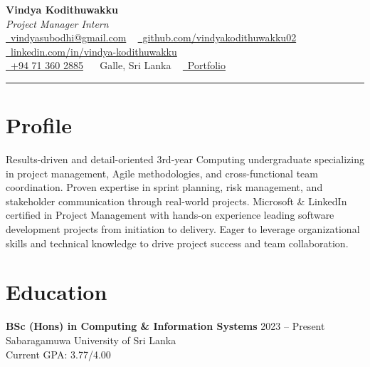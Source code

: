 \documentclass[letterpaper,10.8pt]{article}
\begin{document}
\fontsize{10.5}{12}\selectfont

\begin{center}
{\Huge\color{accentTitle}\textbf{Vindya Kodithuwakku}}\\[3pt]
{\large\textit{Project Manager Intern}}\\[4pt]
\href{mailto:vindyasubodhi@gmail.com}{\faEnvelope~vindyasubodhi@gmail.com} ~
\href{https://github.com/vindyakodithuwakku02}{\faGithub~github.com/vindyakodithuwakku02} ~
\href{https://www.linkedin.com/in/vindya-kodithuwakku-bb6187202}{\faLinkedin~linkedin.com/in/vindya-kodithuwakku}\\[2pt]
\href{tel:+94713602885}{\faPhone~+94 71 360 2885} ~
\faMapMarker*~Galle, Sri Lanka ~
\href{https://vindyakodithuwakku02.github.io/my_portfolio/}{\faGlobe~Portfolio}\\[4pt]
{\color{accentLine}\hrule}
\end{center}

\vspace{-20pt}
\section{Profile}
\vspace{-2pt}
\justifying
Results-driven and detail-oriented 3rd-year Computing undergraduate specializing in project management, Agile methodologies, and cross-functional team coordination. Proven expertise in sprint planning, risk management, and stakeholder communication through real-world projects. Microsoft \& LinkedIn certified in Project Management with hands-on experience leading software development projects from initiation to delivery. Eager to leverage organizational skills and technical knowledge to drive project success and team collaboration.

\section{Education}
\vspace{-1pt}

\noindent\textbf{BSc (Hons) in Computing \& Information Systems} \hfill 2023 – Present\\
Sabaragamuwa University of Sri Lanka\\
Current GPA: 3.77/4.00
\end{document}
